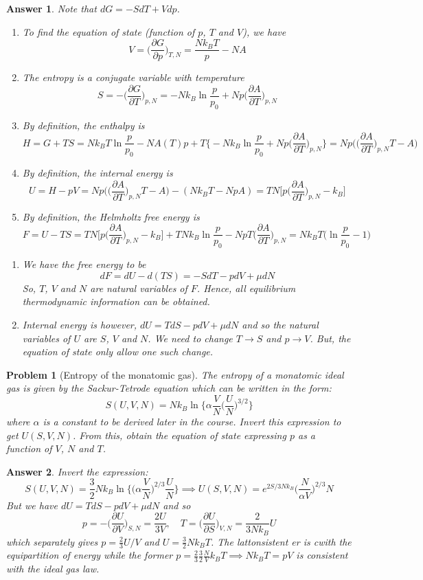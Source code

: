 \documentclass[a4paper]{article}
\newtheorem{ans}{Answer}[section]
\theoremstyle{new}
\newtheorem{qns}{Problem}[section]
\begin{document}
\begin{ans}
Note that $dG=-SdT+Vdp$.
\begin{enumerate}[label=(\alph*)]
\item To find the equation of state (function of $p$, $T$ and $V$), we have
$$V=\bigg(\frac{\partial G}{\partial p}\bigg)_{T,N}=\frac{Nk_BT}{p}-NA$$
\item The entropy is a conjugate variable with temperature
$$S=-\bigg(\frac{\partial G}{\partial T}\bigg)_{p,N}=-Nk_B\ln\frac{p}{p_0}+Np\bigg(\frac{\partial A}{\partial T}\bigg)_{p,N}$$
\item By definition, the enthalpy is
$$H=G+TS=Nk_BT\ln\frac{p}{p_0}-NA(T)p+T\bigg\{-Nk_B\ln\frac{p}{p_0}+Np\bigg(\frac{\partial A}{\partial T}\bigg)_{p,N}\bigg\}=Np\bigg(\bigg(\frac{\partial A}{\partial T}\bigg)_{p,N}T-A\bigg)$$
\item By definition, the internal energy is
$$U=H-pV=Np\bigg(\bigg(\frac{\partial A}{\partial T}\bigg)_{p,N}T-A\bigg)-(Nk_BT-NpA)=TN\bigg[p\bigg(\frac{\partial A}{\partial T}\bigg)_{p,N}-k_B\bigg]$$
\item By definition, the Helmholtz free energy is
$$F=U-TS=TN\bigg[p\bigg(\frac{\partial A}{\partial T}\bigg)_{p,N}-k_B\bigg]+TNk_B\ln\frac{p}{p_0}-NpT\bigg(\frac{\partial A}{\partial T}\bigg)_{p,N}=Nk_BT\bigg(\ln\frac{p}{p_0}-1\bigg)$$
\end{enumerate}
\begin{enumerate}[label=\roman*]
\item We have the free energy to be
$$dF=dU-d(TS)=-SdT-pdV+\mu dN$$
So, $T$, $V$ and $N$ are natural variables of $F$. Hence, all equilibrium thermodynamic information can be obtained.
\item Internal energy is however, $dU=TdS-pdV+\mu dN$ and so the natural variables of $U$ are $S$, $V$ and $N$. We need to change $T\rightarrow S$ and $p\rightarrow V$. But, the equation of state only allow one such change.
\end{enumerate}
\end{ans}
\begin{qns}[Entropy of the monatomic gas]
The entropy of a monatomic ideal gas is given by the Sackur-Tetrode equation which can be written in the form:
$$S(U,V,N)=Nk_B\ln\bigg\{\alpha\frac{V}{N}\bigg(\frac{U}{N}\bigg)^{3/2}\bigg\}$$
where $\alpha$ is a constant to be derived later in the course. Invert this expression to get $U(S, V, N)$. From this, obtain the equation of state expressing $p$ as a function of $V$, $N$ and $T$.
\end{qns}
\begin{ans}
Invert the expression:
$$S(U,V,N)=\frac{3}{2}Nk_B\ln\bigg\{\bigg(\alpha\frac{V}{N}\bigg)^{2/3}\frac{U}{N}\bigg\}\implies U(S,V,N)=e^{2S/3Nk_B}\bigg(\frac{N}{\alpha V}\bigg)^{2/3}N$$
But we have $dU=TdS-pdV+\mu dN$ and so
$$p=-\bigg(\frac{\partial U}{\partial V}\bigg)_{S,N}=\frac{2U}{3V},\quad T=\bigg(\frac{\partial U}{\partial S}\bigg)_{V,N}=\frac{2}{3Nk_B}U$$
which separately gives $p=\frac{2}{3}U/V$ and $U=\frac{3}{2}Nk_BT$. The lattonsistent er is cwith the equipartition of energy while the former $p=\frac{2}{3}\frac{3}{2}\frac{N}{V}k_BT\implies Nk_BT=pV$ is consistent with the ideal gas law.
\end{ans}
\end{document}

